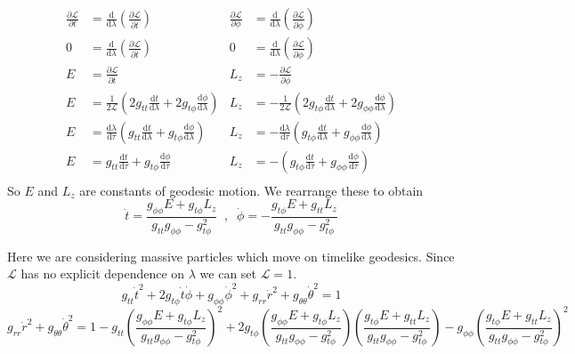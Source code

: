 \documentclass[12pt]{extarticle}
\begin{document}
\begin{align*}
\frac{\partial \mathcal{L}}{\partial t}&=\frac{\mathrm{d}}{\mathrm{d}\lambda}\left(\frac{\partial \mathcal{L}}{\partial \dot{t}}\right)  & \frac{\partial \mathcal{L}}{\partial \phi}&=\frac{\mathrm{d}}{\mathrm{d}\lambda}\left(\frac{\partial \mathcal{L}}{\partial \dot{\phi}}\right) \\
0&=\frac{\mathrm{d}}{\mathrm{d}\lambda}\left(\frac{\partial \mathcal{L}}{\partial \dot{t}}\right)& 0&= \frac{\mathrm{d}}{\mathrm{d}\lambda}\left(\frac{\partial \mathcal{L}}{\partial \dot{\phi}}\right) \\
E&=\frac{\partial \mathcal{L}}{\partial \dot{t}} &L_z &= -\frac{\partial \mathcal{L}}{\partial \dot{\phi}}\\
E&=\frac{1}{2\mathcal{L}}\left(2g_{tt}\frac{\mathrm{d}t}{\mathrm{d}\lambda}+2g_{t\phi}\frac{\mathrm{d}\phi}{\mathrm{d}\lambda}\right) &L_z &= -\frac{1}{2\mathcal{L}}\left(2g_{t\phi}\frac{\mathrm{d}t}{\mathrm{d}\lambda}+2g_{\phi\phi}\frac{\mathrm{d}\phi}{\mathrm{d}\lambda}\right)\\
E&= \frac{\mathrm{d}\lambda}{\mathrm{d}\tau}\left(g_{tt}\frac{\mathrm{d}t}{\mathrm{d}\lambda}+g_{t\phi}\frac{\mathrm{d}\phi}{\mathrm{d}\lambda}\right) & L_z &=-\frac{\mathrm{d}\lambda}{\mathrm{d}\tau}\left(g_{t\phi}\frac{\mathrm{d}t}{\mathrm{d}\lambda}+g_{\phi\phi}\frac{\mathrm{d}\phi}{\mathrm{d}\lambda}\right)\\
E &= g_{tt}\frac{\mathrm{d}t}{\mathrm{d}\tau}+g_{t\phi}\frac{\mathrm{d}\phi}{\mathrm{d}\tau} & L_z &= -\left(g_{t\phi}\frac{\mathrm{d}t}{\mathrm{d}\tau}+g_{\phi\phi}\frac{\mathrm{d}\phi}{\mathrm{d}\tau}\right)\\
\end{align*}
So $E$ and $L_z$ are constants of geodesic motion. We rearrange these to obtain
$$\dot{t} = \frac{g_{\phi \phi}E+g_{t\phi}L_z}{g_{tt}g_{\phi \phi}-g_{t\phi}^2} \;\;, \;\; \dot\phi = -\frac{g_{t\phi}E+g_{tt}L_z}{g_{tt}g_{\phi \phi}-g_{t\phi}^2}$$

Here we are considering massive particles which move on timelike geodesics. Since $\mathcal{L}$ has no explicit dependence on $\lambda$ we can set $\mathcal{L} = 1$.
$$g_{tt}\dot{t}^2+2g_{t\phi}\dot{t}\dot{\phi}+g_{\phi \phi}\dot{\phi}^2+g_{rr}\dot{r}^2+g_{\theta \theta}\dot{\theta}^2 = 1$$
$$g_{rr}\dot{r}^2+g_{\theta \theta}\dot{\theta}^2 = 1 -g_{tt}\left(\frac{g_{\phi \phi}E+g_{t\phi}L_z}{g_{tt}g_{\phi \phi}-g_{t\phi}^2}\right)^2+
2g_{t\phi}\left(\frac{g_{\phi \phi}E+g_{t\phi}L_z}{g_{tt}g_{\phi \phi}-g_{t\phi}^2}\right)\left(\frac{g_{t\phi}E+g_{tt}L_z}{g_{tt}g_{\phi \phi}-g_{t\phi}^2}\right)-
g_{\phi \phi}\left(\frac{g_{t\phi}E+g_{tt}L_z}{g_{tt}g_{\phi \phi}-g_{t\phi}^2}\right)^2$$
\end{document}
